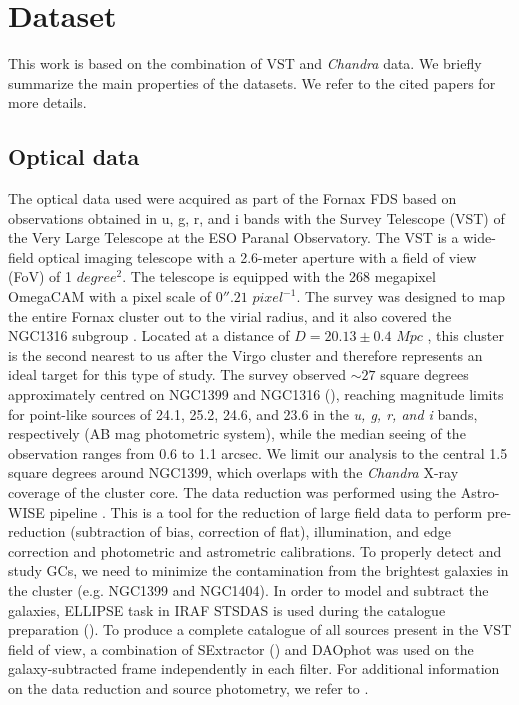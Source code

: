 \documentclass{aa}
\begin{document}
\section{Dataset}
This work is based on the combination of VST and \textit{Chandra} data. We briefly summarize the main properties of the datasets. We refer to the cited papers for more details.

\subsection{Optical data}
\label{optical_data}

The optical data used were acquired as part of the  Fornax FDS  based on observations obtained in u, g, r,  and i bands with the Survey Telescope (VST) of the Very Large Telescope at the ESO Paranal Observatory. The VST is a wide-field optical imaging telescope with a 2.6-meter aperture with a field of view (FoV) of 1 $degree^2$. The telescope is equipped with the 268 megapixel OmegaCAM  with a pixel scale of $0''.21$ $pixel^{-1}$. The survey was designed to map the entire Fornax cluster out to the virial radius, and it also covered the NGC1316 subgroup \citep{Iodice2017}. Located at a distance of $D=20.13\pm0.4$ $Mpc$ \citep{Blakeslee2009}, this cluster is the second nearest to us after the Virgo cluster and therefore represents an ideal target for this type of study.
The survey observed $\sim 27$ square degrees approximately centred on NGC1399 and NGC1316 (\citealt{Cantiello2020}), reaching magnitude limits for point-like sources of 24.1, 25.2, 24.6, and 23.6 in the \textit{u, g, r, \textup{and} i} bands, respectively (AB mag photometric system), while the median seeing of the observation ranges from 0.6 to 1.1 arcsec. We limit our analysis to the central 1.5 square degrees around NGC1399, which overlaps with the \textit{Chandra} X-ray coverage of the cluster core.  The data reduction was performed using the Astro-WISE pipeline \cite[see e.g.][]{Venhola2019}. This is a tool for the reduction of large field data to perform pre-reduction (subtraction of bias, correction of flat), illumination, and edge correction and photometric and astrometric calibrations. To properly detect and study GCs, we need to minimize the contamination from the brightest galaxies in the cluster (e.g. NGC1399 and NGC1404). In order to model and subtract the galaxies, ELLIPSE task in IRAF STSDAS is used during the catalogue preparation (\citealt{Jedrzejewski1987}). To produce a complete catalogue of all sources present in the VST field of view, a combination of SExtractor (\citealt{Bertin}) and DAOphot \citep{Stetson1984} was used on the galaxy-subtracted frame independently in each filter. For additional information on the data reduction and source photometry, we refer to \citealt{Cantiello2020}.  %
\end{document}
